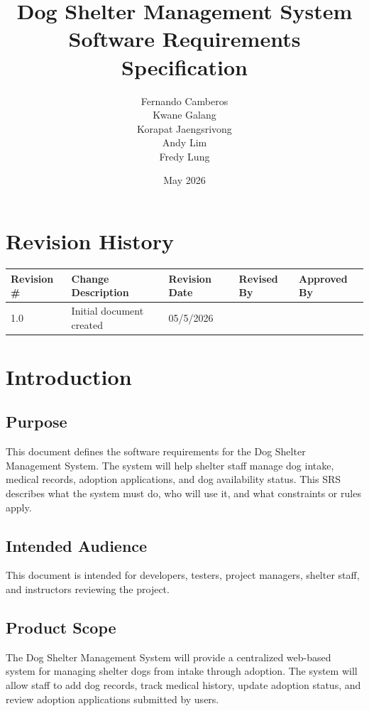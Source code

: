 \documentclass[12pt]{article}
\title{Dog Shelter Management System\\Software Requirements Specification}
\author{Fernando Camberos\\Kwane Galang\\Korapat Jaengsrivong\\Andy Lim\\Fredy Lung}
\date{May 2026}
\begin{document}
\maketitle
\newpage
\tableofcontents
\section*{Revision History}
\begin{longtable}{|p{}|p{}|p{}|p{}|p{}|}
\hline
Revision \# & Change Description & Revision Date & Revised By & Approved By \\
\hline
1.0 & Initial document created & 05/5/2026 &  &  \\
\hline
\end{longtable}
\newpage
\section{Introduction}
\subsection{Purpose}
This document defines the software requirements for the Dog Shelter Management System. The system will help shelter staff manage dog intake, medical records, adoption applications, and dog availability status. This SRS describes what the system must do, who will use it, and what constraints or rules apply.

\subsection{Intended Audience}
This document is intended for developers, testers, project managers, shelter staff, and instructors reviewing the project.

\subsection{Product Scope}
The Dog Shelter Management System will provide a centralized web-based system for managing shelter dogs from intake through adoption. The system will allow staff to add dog records, track medical history, update adoption status, and review adoption applications submitted by users.
\end{document}
